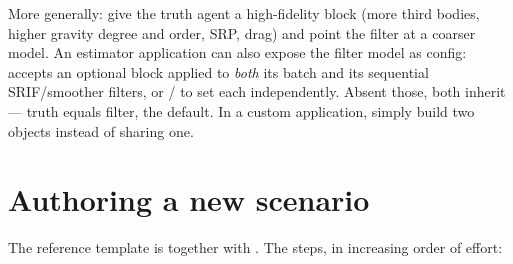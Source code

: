 More generally: give the truth agent a high-fidelity  block (more
third bodies, higher gravity degree and order, SRP, drag) and point the filter at
a coarser model. An estimator application can also expose the filter model as
config:  accepts an optional 
block applied to \emph{both} its batch and its sequential SRIF/smoother filters,
or  /  to set each
independently. Absent those, both inherit  --- truth
equals filter, the default. In a custom application, simply build two
 objects instead of sharing one.

\section{Authoring a new scenario}
\label{sec:sim-authoring}

The reference template is  together with
. The steps, in increasing order of effort:


